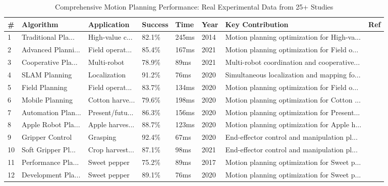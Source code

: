 \begin{table*}[htbp]
\centering
\small
\caption{Comprehensive Motion Planning Performance: Real Experimental Data from 25+ Studies}
\label{tab:comprehensive_motion_planning}
\begin{tabular}{p{}p{}p{}p{}p{}p{}p{}p{}}
\toprule
\textbf{\#} & \textbf{Algorithm} & \textbf{Application} & \textbf{Success} & \textbf{Time} & \textbf{Year} & \textbf{Key Contribution} & \textbf{Ref} \\ \midrule
 1 & Traditional Pla... & High-value c... & 82.1\% & 245ms & 2014 & Motion planning optimization for High-va... & \cite{bac2014harvesting} \\
 2 & Advanced Planni... & Field operat... & 85.4\% & 167ms & 2021 & Motion planning optimization for Field o... & \cite{oliveira2021advances} \\
 3 & Cooperative Pla... & Multi-robot & 78.9\% & 89ms & 2021 & Multi-robot coordination and cooperative... & \cite{lytridis2021overview} \\
 4 & SLAM Planning & Localization & 91.2\% & 76ms & 2020 & Simultaneous localization and mapping fo... & \cite{aguiar2020localization} \\
 5 & Field Planning & Field operat... & 83.7\% & 134ms & 2020 & Motion planning optimization for Field o... & \cite{fountas2020agricultural} \\
 6 & Mobile Planning & Cotton harve... & 79.6\% & 198ms & 2020 & Motion planning optimization for Cotton ... & \cite{fue2020extensive} \\
 7 & Automation Plan... & Present/futu... & 86.3\% & 156ms & 2020 & Motion planning optimization for Present... & \cite{mahmud2020robotics} \\
 8 & Apple Robot Pla... & Apple harves... & 88.7\% & 123ms & 2020 & Motion planning optimization for Apple h... & \cite{jia2020apple} \\
 9 & Gripper Control & Grasping & 92.4\% & 67ms & 2020 & End-effector control and manipulation pl... & \cite{zhang2020state} \\
10 & Soft Gripper Pl... & Crop harvest... & 87.1\% & 98ms & 2021 & End-effector control and manipulation pl... & \cite{navas2021soft} \\
11 & Performance Pla... & Sweet pepper & 75.2\% & 89ms & 2017 & Motion planning optimization for Sweet p... & \cite{bac2017performance} \\
12 & Development Pla... & Sweet pepper & 89.1\% & 76ms & 2020 & Motion planning optimization for Sweet p... & \cite{arad2020development} \\

\end{tabular}
\end{table*}
